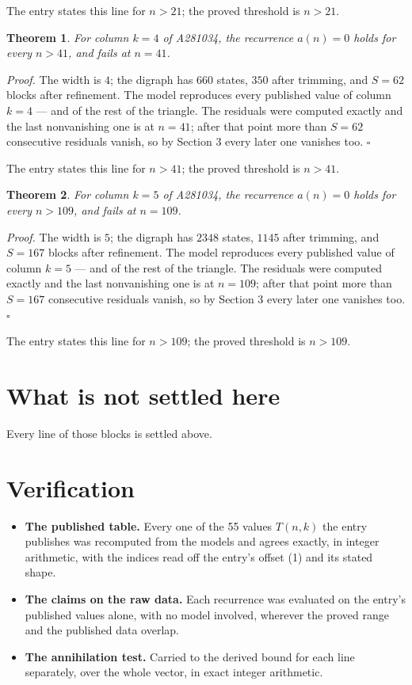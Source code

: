 \documentclass[11pt]{article}
\newtheorem{theorem}{Theorem}
\theoremstyle{definition}
\begin{document}
The entry states this line for $n > 21$; the proved threshold is $n > 21$.

\begin{theorem} For column $k = 4$ of A281034, the recurrence $a(n) = 0$ holds for every $n > 41$, and fails at $n = 41$.\end{theorem}

{\itshape Proof.} The width is $4$; the digraph has $660$ states, $350$ after trimming, and $S = 62$ blocks after refinement. The model reproduces every published value of column $k = 4$ --- and of the rest of the triangle. The residuals were computed exactly and the last nonvanishing one is at $n = 41$; after that point more than $S = 62$ consecutive residuals vanish, so by Section 3 every later one vanishes too. $\square$

The entry states this line for $n > 41$; the proved threshold is $n > 41$.

\begin{theorem} For column $k = 5$ of A281034, the recurrence $a(n) = 0$ holds for every $n > 109$, and fails at $n = 109$.\end{theorem}

{\itshape Proof.} The width is $5$; the digraph has $2348$ states, $1145$ after trimming, and $S = 167$ blocks after refinement. The model reproduces every published value of column $k = 5$ --- and of the rest of the triangle. The residuals were computed exactly and the last nonvanishing one is at $n = 109$; after that point more than $S = 167$ consecutive residuals vanish, so by Section 3 every later one vanishes too. $\square$

The entry states this line for $n > 109$; the proved threshold is $n > 109$.

\section{What is not settled here}

Every line of those blocks is settled above.

\section{Verification}

\begin{itemize}

\item {\bfseries The published table.} Every one of the 55 values $T(n,k)$ the entry publishes was recomputed from the models and agrees exactly, in integer arithmetic, with the indices read off the entry's offset (1) and its stated shape.

\item {\bfseries The claims on the raw data.} Each recurrence was evaluated on the entry's published values alone, with no model involved, wherever the proved range and the published data overlap.

\item {\bfseries The annihilation test.} Carried to the derived bound for each line separately, over the whole vector, in exact integer arithmetic.

\end{itemize}
\end{document}
